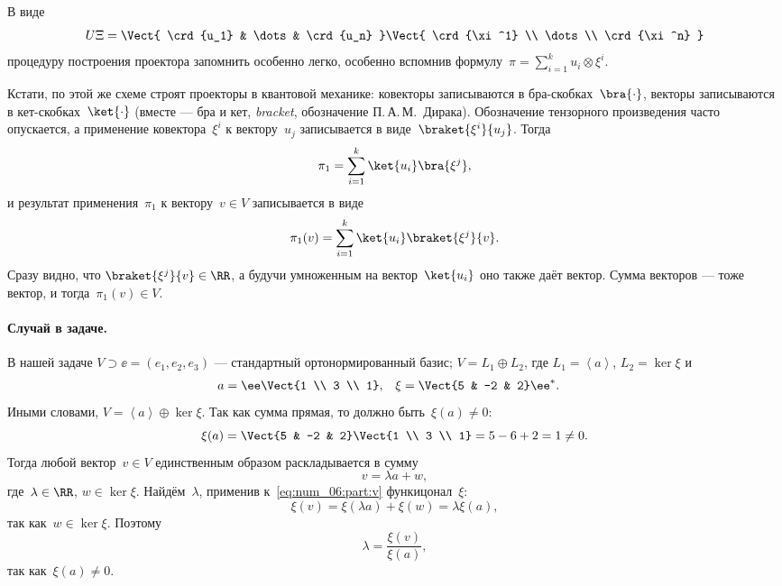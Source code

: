 \begin{solution}
	В виде
	\[
		U\Xi =
		\Vect{
			\crd{u_1} &
			\dots &
			\crd{u_n}
		}
		\Vect{
			\crd{\xi^1} \\
			\dots \\
			\crd{\xi^n}
		}
	\]
	процедуру построения проектора запомнить особенно легко, особенно вспомнив формулу~$\pi = \sum_{i=1}^k u_i \otimes \xi^i$.

	Кстати, по этой же схеме строят проекторы в квантовой механике: ковекторы записываются в бра-скобках~$\bra{\cdot}$, векторы записываются в кет-скобках~$\ket{\cdot}$ (вместе --- бра и кет, \emph{bracket}, обозначение П.\,А.\,М.~Дирака). Обозначение тензорного произведения часто опускается, а применение ковектора~$\xi^i$ к вектору~$u_j$ записывается в виде~$\braket{\xi^i}{u_j}$.
	Тогда
	\[
		\pi_1 =
		\sum_{i = 1}^k
			\ket{u_i}
			\bra{\xi^j}
		,
	\]
	и результат применения~$\pi_1$ к вектору~$v \in V$ записывается в виде
	\[
		\pi_1(v) =
		\sum_{i = 1}^k
			\ket{u_i}
			\braket{\xi^j}{v}
		.
	\]
	Сразу видно, что $\braket{\xi^j}{v} \in \RR$, а будучи умноженным на вектор~$\ket{u_i}$ оно также даёт вектор. Сумма векторов --- тоже вектор, и тогда~$\pi_1(v) \in V$.

	\paragraph{Случай в задаче.}
	В нашей задаче $V \supset \ee = (e_1, e_2, e_3)$ --- стандартный ортонормированный базис; $V = L_1 \oplus L_2$, где $L_1 = \left< a\right>$, $L_2 = \ker{\xi}$ и
	\begin{align*}
		a &=
		\ee
		\Vect{1 \\ 3 \\ 1}
		,
		&
		\xi &=
		\Vect{5 & -2 & 2}
		\ee^*
		.
	\end{align*}
	Иными словами, $V = \left< a\right> \oplus \ker{\xi}$.
	Так как сумма прямая, то должно быть~$\xi(a) \neq 0$:
	\[
		\xi(a) =
		\Vect{5 & -2 & 2}
		\Vect{1 \\ 3 \\ 1}
		=
		5 - 6 + 2 = 1 \neq 0.
	\]
	Тогда любой вектор~$v \in V$ единственным образом раскладывается в сумму
	\begin{equation}
		\label{eq:num_06:part:v}
		v = \lambda a + w
		,
	\end{equation}
	где~$\lambda \in \RR$, $w \in \ker{\xi}$. Найдём~$\lambda$, применив к~\eqref{eq:num_06:part:v} функицонал~$\xi$:
	\[
		\xi(v) = \xi(\lambda a) + \xi(w) = \lambda \xi(a)
		,
	\]
	так как~$w \in \ker{\xi}$. Поэтому
	\[
		\lambda = \frac{\xi(v)}{\xi(a)},
	\]
	так как~$\xi(a) \neq 0$.


\end{solution}
